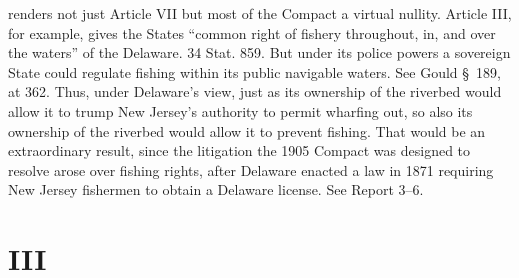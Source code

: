 renders not just Article VII but most of the Compact a virtual nullity.
Article III, for example, gives the States ``common right of fishery
throughout, in, and over the waters'' of the Delaware. 34 Stat. 859.
But under its police powers a sovereign State could regulate fishing
\newpage  within its public navigable waters. See Gould \S~189, at 362.
Thus, under Delaware's view, just as its ownership of the riverbed
would allow it to trump New Jersey's authority to permit wharfing
out, so also its ownership of the riverbed would allow it to prevent
fishing. That would be an extraordinary result, since the litigation the
1905 Compact was designed to resolve arose over fishing rights, after
Delaware enacted a law in 1871 requiring New Jersey fishermen to obtain
a Delaware license. See Report 3--6.

\section{III}

